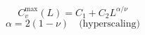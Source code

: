 \documentclass[xcolor=dvipsnames]{beamer}
\begin{document}
\begin{frame}
\begin{columns}[T]
  \begin{column}{5.8cm}
    \begin{figure}[h]
      \centering
      \resizebox{\columnwidth}{!}{}
    \end{figure}
    \begin{equation*}
    C^{\max}_v(L)=C_1+C_2L^{\alpha/\nu}
  \end{equation*}
  \begin{equation*}
    \alpha=2(1-\nu) \quad \text{(hyperscaling)}
  \end{equation*}
  \end{column}
  \begin{column}{5.8cm}
    \begin{figure}[h]
      \centering
     \resizebox{\columnwidth}{!}{ }
    \end{figure}
  \end{column}
\end{columns}
\end{frame}
\end{document}
